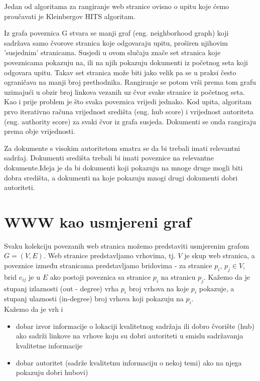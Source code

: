 \documentclass[11pt]{article}
\begin{document}
Jedan od algoritama za rangiranje web stranice ovisno o upitu koje ćemo proučavati je Kleinbergov HITS algoritam. 

Iz grafa poveznica G stvara se manji graf (eng. neighborhood
graph) koji sadržava samo čvorove stranica koje odgovaraju upitu, proširen njihovim 'susjednim' stranicama. Susjedi u ovom slučaju znače set stranica koje poveznicama pokazuju na, ili na njih pokazuju dokumenti iz početnog seta koji odgovara upitu. Takav set stranica može biti jako velik pa se u praksi često ograničava na manji broj prethodnika. Rangiranje se potom vrši prema tom grafu uzimajući u obzir broj linkova vezanih uz čvor svake stranice iz početnog seta. Kao i prije problem je što svaka poveznica vrijedi jednako.
Kod upita, algoritam prvo iterativno računa vrijednost središta (eng. hub score) i vrijednost autoriteta (eng. authority score) za svaki čvor iz grafa susjeda. Dokumenti se onda rangiraju prema obje vrijednosti. 

Za dokumente s visokim autoritetom smatra se da bi trebali imati relevantni sadržaj. Dokumenti središta trebali bi imati poveznice na relevantne dokumente.Ideja je da bi dokumenti koji pokazuju na mnoge druge mogli biti dobra središta, a dokumenti na koje pokazuju mnogi drugi dokumenti dobri autoriteti.

\newpage
\section{WWW kao usmjereni graf}

Svaku kolekciju povezanih web stranica možemo predstaviti usmjerenim grafom $G=(V,E)$. Web stranice predstavljamo vrhovima, tj. $V$ je skup web stranica, a poveznice između stranicama predstavljamo bridovima - za stranice $p_{i}$, $p_{j} \in V$, brid $e_{ij}$ je u $E$ ako postoji poveznica sa stranice $p_{i}$ na stranicu $p_{j}$. Kažemo da je stupanj izlaznosti (out - degree) vrha $p_{i}$ broj vrhova na koje $p_{i}$ pokazuje, a stupanj ulaznosti (in-degree) broj vrhova koji pokazuju na $p_{i}$. \\ 

Kažemo da je vrh i
\begin{itemize}
    \item dobar izvor informacije o lokaciji kvalitetnog sadržaja ili dobro čvorište (hub) ako sadrži  linkove na vrhove koju su dobri autoriteti u smislu sadržavanja kvalitetne informacije
    \item dobar autoritet (sadrže kvalitetnu informaciju o nekoj temi) ako na njega pokazuju dobri hubovi)
\end{itemize}
\end{document}
